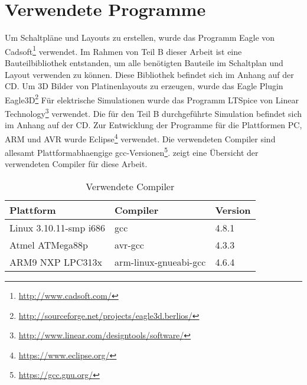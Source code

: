 \section{Verwendete Programme}
Um Schaltpläne und Layouts zu erstellen, wurde das Programm Eagle von Cadsoft\footnote{\url{http://www.cadsoft.com/}} verwendet. Im Rahmen von Teil B dieser Arbeit ist eine Bauteilbibliothek entstanden, um alle benötigten Bauteile im Schaltplan und Layout verwenden zu können. Diese Bibliothek befindet sich im Anhang auf der CD.
Um 3D Bilder von Platinenlayouts zu erzeugen, wurde das Eagle Plugin Eagle3D\footnote{\url{http://sourceforge.net/projects/eagle3d.berlios/}} 
Für elektrische Simulationen wurde das Programm LTSpice von Linear Technology\footnote{\url{http://www.linear.com/designtools/software/}} verwendet. Die für den Teil B durchgeführte Simulation befindet sich im Anhang auf der CD.
Zur Entwicklung der Programme für die Plattformen PC, ARM und AVR wurde Eclipse\footnote{\url{https://www.eclipse.org/}} verwendet. Die verwendeten Compiler sind allesamt Plattformabhaengige gcc-Versionen\footnote{\url{https://gcc.gnu.org/}}.  zeigt eine Übersicht der verwendeten Compiler für diese Arbeit.

\begin{table}[h]
\begin{tabular}{|p{4.5cm}|p{4cm}|p{4cm}|}\hline
\rowcolor{TableBackgroundColor} 
\textbf{Plattform}		&	\textbf{Compiler}		&	\textbf{Version}  \\ \hline
 Linux 3.10.11-smp i686	&	gcc						& 4.8.1	\\ \hline
 Atmel ATMega88p		&	avr-gcc					& 4.3.3	\\ \hline
 ARM9 NXP LPC313x		&	arm-linux-gnueabi-gcc	& 4.6.4	\\ \hline
\end{tabular}
\caption{Verwendete Compiler}
\label{tab:verwendete_compiler}
\end{table}



